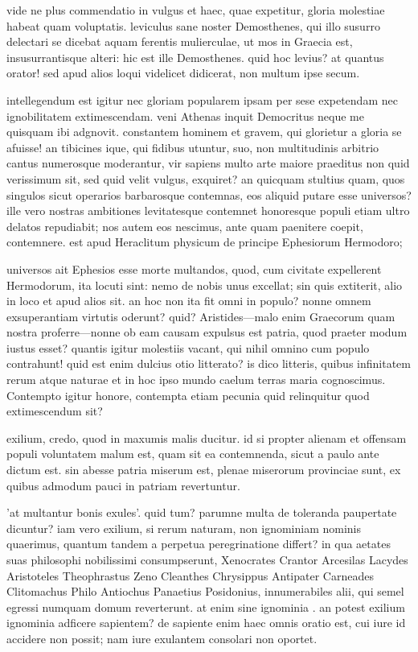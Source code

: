  vide ne plus commendatio in vulgus et haec, quae expetitur, gloria molestiae habeat quam voluptatis. leviculus sane noster Demosthenes, qui illo susurro delectari se dicebat aquam ferentis mulierculae, ut mos in Graecia est, insusurrantisque alteri: hic est ille Demosthenes. quid hoc levius? at quantus orator! sed apud alios loqui videlicet didicerat, non multum ipse secum.

 intellegendum est igitur nec gloriam popularem ipsam per sese expetendam nec ignobilitatem extimescendam. veni Athenas inquit Democritus neque me quisquam ibi adgnovit. constantem hominem et gravem, qui glorietur a gloria se afuisse! an tibicines ique, qui fidibus utuntur, suo, non multitudinis arbitrio cantus numerosque moderantur, vir sapiens multo arte maiore praeditus non quid verissimum sit, sed quid velit vulgus, exquiret? an quicquam stultius quam, quos singulos sicut operarios barbarosque contemnas, eos aliquid putare esse universos? ille vero nostras ambitiones levitatesque contemnet honoresque populi etiam ultro delatos repudiabit; nos autem eos nescimus, ante quam paenitere coepit, contemnere. est apud Heraclitum physicum de principe Ephesiorum Hermodoro;

 universos ait Ephesios esse morte multandos, quod, cum civitate expellerent Hermodorum, ita locuti sint: nemo de nobis unus excellat; sin quis extiterit, alio in loco et apud alios sit. an hoc non ita fit omni in populo? nonne omnem exsuperantiam virtutis oderunt? quid? Aristides—malo enim Graecorum quam nostra proferre—nonne ob eam causam expulsus est patria, quod praeter modum iustus esset? quantis igitur molestiis vacant, qui nihil omnino cum populo contrahunt! quid est enim dulcius otio litterato? is dico litteris, quibus infinitatem rerum atque naturae et in hoc ipso mundo caelum terras maria cognoscimus. Contempto igitur honore, contempta etiam pecunia quid relinquitur quod extimescendum sit?

 exilium, credo, quod in maxumis malis ducitur. id si propter alienam et offensam populi voluntatem malum est, quam sit ea contemnenda, sicut a paulo ante dictum est. sin abesse patria miserum est, plenae miserorum provinciae sunt, ex quibus admodum pauci in patriam revertuntur.

 'at multantur bonis exules'. quid tum? parumne multa de toleranda paupertate dicuntur? iam vero exilium, si rerum naturam, non ignominiam nominis quaerimus, quantum tandem a perpetua peregrinatione differt? in qua aetates suas philosophi nobilissimi consumpserunt, Xenocrates Crantor Arcesilas Lacydes Aristoteles Theophrastus Zeno Cleanthes Chrysippus Antipater Carneades Clitomachus Philo Antiochus Panaetius Posidonius, innumerabiles alii, qui semel egressi numquam domum reverterunt. at enim sine ignominia . an potest exilium ignominia adficere sapientem? de sapiente enim haec omnis oratio est, cui iure id accidere non possit; nam iure exulantem consolari non oportet.


